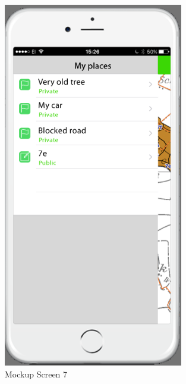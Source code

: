 \begin{figure}[h]
\centering
    \includegraphics[width=0.7\textwidth]{mockup1-7}
    \caption{Mockup Screen 7}
    \label{fig:mesh7}
\end{figure}


